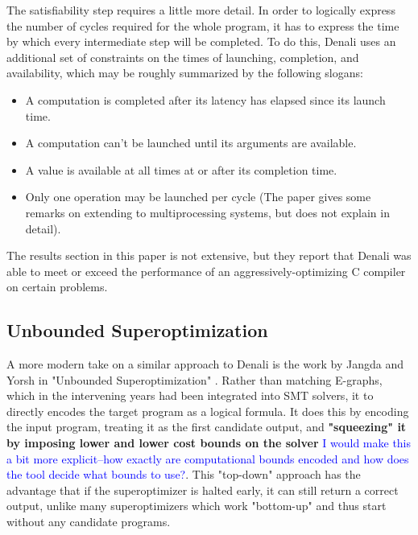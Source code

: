 \documentclass[12pt,twoside]{reedthesis}
\newcommand{\comment}[2]{\textbf{#1} \textcolor{blue}{#2}}
\begin{document}
            The satisfiability step requires a little more detail.
            In order to logically express the number of cycles required for the whole program, it has to express the time by which every intermediate step will be completed.
            To do this, Denali uses an additional set of constraints on the times of launching, completion, and availability, which may be roughly summarized by the following slogans:
            \begin{itemize}
                \item A computation is completed after its latency has elapsed since its launch time.
                \item A computation can't be launched until its arguments are available.
                \item A value is available at all times at or after its completion time.
                \item Only one operation may be launched per cycle (The paper gives some remarks on extending to multiprocessing systems, but does not explain in detail).
            \end{itemize}
                
            The results section in this paper is not extensive, but they report that Denali was able to meet or exceed the performance of an aggressively-optimizing C compiler on certain problems.

        \subsection{Unbounded Superoptimization}
            A more modern take on a similar approach to Denali is the work by Jangda and Yorsh in "Unbounded Superoptimization" \cite{jangda2017unbounded}.
            Rather than matching E-graphs, which in the intervening years had been integrated into SMT solvers, it to directly encodes the target program as a logical formula.
            It does this by encoding the input program, treating it as the first candidate output, and
                \comment{"squeezing" it by imposing lower and lower cost bounds on the solver}{I would make this a bit more explicit--how exactly are computational bounds encoded and how does the tool decide what bounds to use?}.
            This "top-down" approach has the advantage that if the superoptimizer is halted early, it can still return a correct output, unlike many superoptimizers which work "bottom-up" and thus start without any candidate programs.
\end{document}
